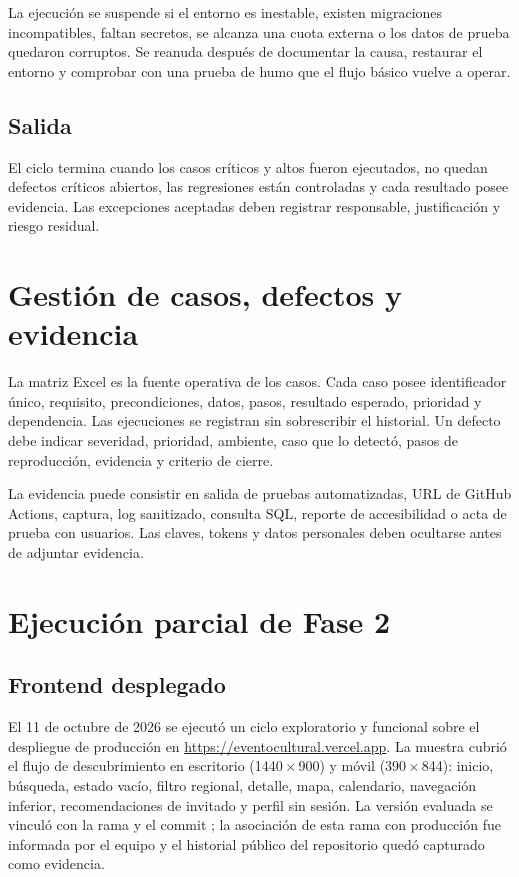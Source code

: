 \documentclass[11pt,a4paper]{article}
\begin{document}
La ejecución se suspende si el entorno es inestable, existen migraciones incompatibles,
faltan secretos, se alcanza una cuota externa o los datos de prueba quedaron corruptos.
Se reanuda después de documentar la causa, restaurar el entorno y comprobar con una prueba
de humo que el flujo básico vuelve a operar.

\subsection{Salida}

El ciclo termina cuando los casos críticos y altos fueron ejecutados, no quedan defectos
críticos abiertos, las regresiones están controladas y cada resultado posee evidencia. Las
excepciones aceptadas deben registrar responsable, justificación y riesgo residual.

\section{Gestión de casos, defectos y evidencia}

La matriz Excel es la fuente operativa de los casos. Cada caso posee identificador único,
requisito, precondiciones, datos, pasos, resultado esperado, prioridad y dependencia. Las
ejecuciones se registran sin sobrescribir el historial. Un defecto debe indicar severidad,
prioridad, ambiente, caso que lo detectó, pasos de reproducción, evidencia y criterio de
cierre.

La evidencia puede consistir en salida de pruebas automatizadas, URL de GitHub Actions,
captura, log sanitizado, consulta SQL, reporte de accesibilidad o acta de prueba con
usuarios. Las claves, tokens y datos personales deben ocultarse antes de adjuntar evidencia.

\section{Ejecución parcial de Fase 2}

\subsection{Frontend desplegado}

El 11 de octubre de 2026 se ejecutó un ciclo exploratorio y funcional sobre el despliegue
de producción en \url{https://eventocultural.vercel.app}. La muestra cubrió el flujo de
descubrimiento en escritorio (1440\,$\times$\,900) y móvil (390\,$\times$\,844): inicio,
búsqueda, estado vacío, filtro regional, detalle, mapa, calendario, navegación inferior,
recomendaciones de invitado y perfil sin sesión. La versión evaluada se vinculó con la
rama  y el commit ; la asociación de esta rama
con producción fue informada por el equipo y el historial público del repositorio quedó
capturado como evidencia.
\end{document}

